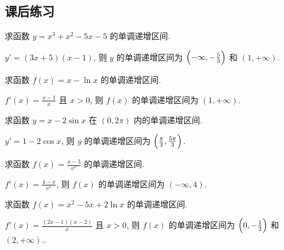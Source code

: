   \subsection{课后练习}
  \begin{exercise}
    求函数 $y=x^3 +x^2 -5x-5$ 的单调递增区间.
  \end{exercise}

  \beginsolution
    $y'=(3x+5)(x-1)$, 则 $y$ 的单调递增区间为 $\Bigl(-\infty,-\frac53\Bigr)$ 和 $(1,+\infty)$.
  \endsolution
  
  \begin{exercise}
    求函数 $f(x)=x-\ln x$ 的单调递增区间.
  \end{exercise}

  \beginsolution
    $f'(x)=\frac{x-1}x$ 且 $x>0$, 则 $f(x)$ 的单调递增区间为 $(1,+\infty)$.
  \endsolution
  
  \begin{exercise}
    求函数 $y=x-2\sin x$ 在 $(0,2\pi)$ 内的单调递增区间.
  \end{exercise}

  \beginsolution
    $y'=1-2\cos x$, 则 $y$ 的单调递增区间为 $\Bigl(\frac{\pi}3,\frac{5\pi}3\Bigr)$.
  \endsolution
  
  \begin{exercise}
    求函数 $f(x)=\frac{x-3}{\mathrm{e}^x}$ 的单调递增区间.
  \end{exercise}

  \beginsolution
    $f'(x)=\frac{4-x}{\mathrm{e}^x}$, 则 $f(x)$ 的单调递增区间为 $(-\infty,4)$.
  \endsolution
  
  \begin{exercise}
    求函数 $f(x)=x^2 -5x+2\ln x$ 的单调递增区间.
  \end{exercise}

  \beginsolution
    $f'(x)=\frac{(2x-1)(x-2)}{x}$ 且 $x>0$, 则 $f(x)$ 的单调递增区间为 $\Bigl(0,-\frac12\Bigr)$ 和 $(2,+\infty)$..
  \endsolution
  
